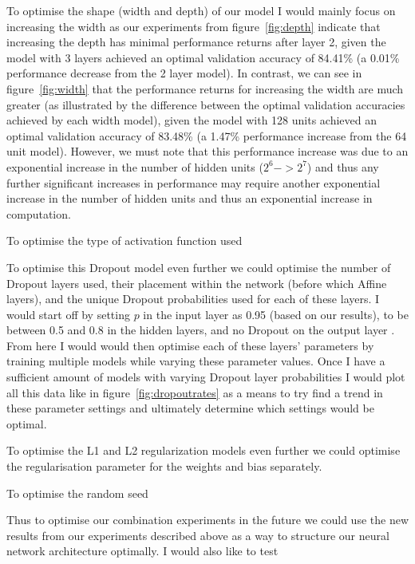 {{To optimise the shape (width and depth) of our model I would mainly focus on increasing the width as our experiments from figure~\ref{fig:depth} indicate that increasing the depth has minimal performance returns after layer 2, given the model with 3 layers achieved an optimal validation accuracy of 84.41\% (a 0.01\% performance decrease from the 2 layer model). In contrast, we can see in figure~\ref{fig:width} that the performance returns for increasing the width are much greater (as illustrated by the difference between the optimal validation accuracies achieved by each width model), given the model with 128 units achieved an optimal validation accuracy of 83.48\% (a 1.47\% performance increase from the 64 unit model). However, we must note that this performance increase was due to an exponential increase in the number of hidden units ($2^6 -> 2^7$) and thus any further significant increases in performance may require another exponential increase in the number of hidden units and thus an exponential increase in computation.

To optimise the type of activation function used

To optimise this Dropout model even further we could optimise the number of Dropout layers used, their placement within the network (before which Affine layers), and the unique Dropout probabilities used for each of these layers. I would start off by setting $p$ in the input layer as 0.95 (based on our results), to be between 0.5 and 0.8 in the hidden layers, and no Dropout on the output layer \cite{machinelearningmastery_2018}. From here I would would then optimise each of these layers' parameters by training multiple models while varying these parameter values. Once I have a sufficient amount of models with varying Dropout layer probabilities I would plot all this data like in figure~\ref{fig:dropoutrates} as a means to try find a trend in these parameter settings and ultimately determine which settings would be optimal.

To optimise the L1 and L2 regularization models even further we could optimise the regularisation parameter for the weights and bias separately.

To optimise the random seed

Thus to optimise our combination experiments in the future we could use the new results from our experiments described above as a way to structure our neural network architecture optimally. I would also like to test 
}
}



